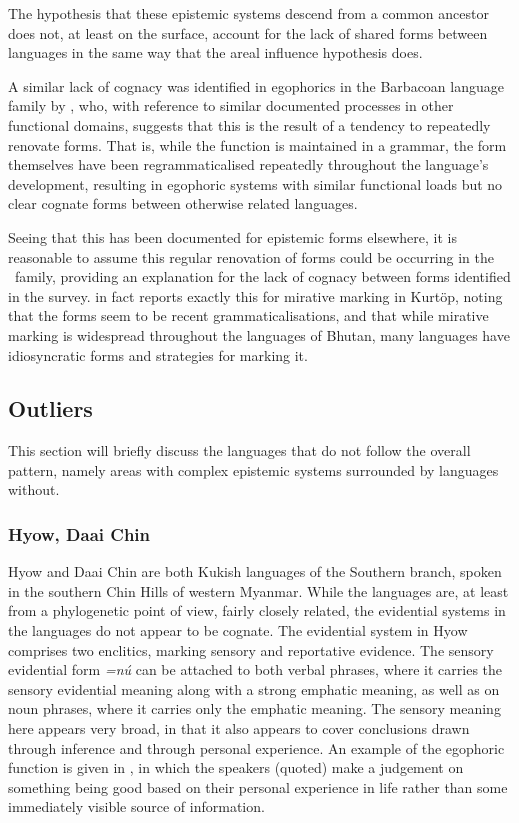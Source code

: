 The hypothesis that these epistemic systems descend from a common ancestor does not, at least on the surface, account for the lack of shared forms between languages in the same way that the areal influence hypothesis does.

A similar lack of cognacy was identified in egophorics in the Barbacoan language family by , who, with reference to similar documented processes in other functional domains, suggests that this is the result of a tendency to repeatedly renovate forms. That is, while the function is maintained in a grammar, the form themselves have been regrammaticalised repeatedly throughout the language's development, resulting in egophoric systems with similar functional loads but no clear cognate forms between otherwise related languages.

Seeing that this has been documented for epistemic forms elsewhere, it is reasonable to assume this regular renovation of forms could be occurring in the \lfam\ family, providing an explanation for the lack of cognacy between forms identified in the survey.  in fact reports exactly this for mirative marking in Kurtöp, noting that the forms seem to be recent grammaticalisations, and that while mirative marking is widespread throughout the languages of Bhutan, many languages have idiosyncratic forms and strategies for marking it.

\subsection{Outliers}\label{ss:History:Outliers}
This section will briefly discuss the languages that do not follow the overall pattern, namely areas with complex epistemic systems surrounded by languages without. 

\subsubsection{Hyow, Daai Chin}
Hyow \cite{Zakaria2018} and Daai Chin \cite{SoHartmann2009} are both Kukish languages of the Southern branch, spoken in the southern Chin Hills of western Myanmar. While the languages are, at least from a phylogenetic point of view, fairly closely related, the evidential systems in the languages do not appear to be cognate.
The evidential system in Hyow \cite[Kukish: Myanmar,][486]{Zakaria2018} comprises two enclitics, marking sensory and reportative evidence. The sensory evidential form \textit{=nú} can be attached to both verbal phrases, where it carries the sensory evidential meaning along with a strong emphatic meaning, as well as on noun phrases, where it carries only the emphatic meaning. The sensory meaning here appears very broad, in that it also appears to cover conclusions drawn through inference and through personal experience. An example of the egophoric function is given in , in which the speakers (quoted) make a judgement on something being good based on their personal experience in life rather than some immediately visible source of information.

